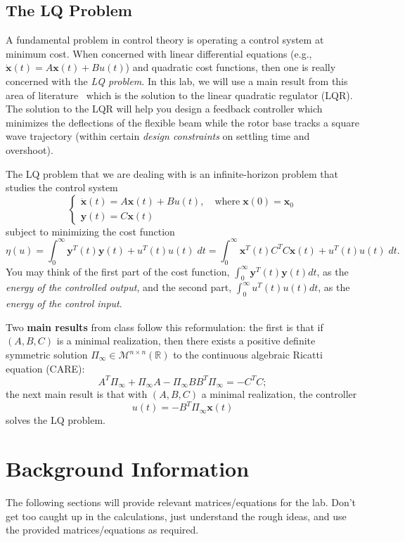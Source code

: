 \subsection{The LQ Problem}
A fundamental problem in control theory is operating a control system at minimum cost. When concerned with linear differential equations (e.g., $\mathbf{\dot{x}}(t) = A\mathbf{x}(t) + Bu(t)$) and quadratic cost functions, then one is really concerned with the \emph{LQ problem}. In this lab, we will use a main result from this area of literature~\cite{kwakernaak1972linear} which is the solution to the linear quadratic regulator (LQR). The solution to the LQR will help you design a feedback controller which minimizes the deflections of the flexible beam while the rotor base tracks a square wave trajectory (within certain \emph{design constraints} on settling time and overshoot).

The LQ problem that we are dealing with is an infinite-horizon problem that studies the control system
\[
    \begin{cases}
        \dot{\mathbf{x}}(t) = A\mathbf{x}(t)+Bu(t), \quad \text{where} \; \mathbf{x}(0) = \mathbf{x}_0 \\
        \mathbf{y}(t) = C \mathbf{x}(t)
    \end{cases}
\]
subject to minimizing the cost function
\[
    \eta(u) = \int_0^{\infty} \mathbf{y}^T(t)\mathbf{y}(t) + u^T(t)u(t) \; dt = \int_0^\infty  \mathbf{x}^T(t) C^T C \mathbf{x}(t) + u^T(t)u(t) \; dt.
\]
You may think of the first part of the cost function, $ \int_0^{\infty} \mathbf{y}^T(t)\mathbf{y}(t) dt$, as the \emph{energy of the controlled output}, and the second part, $\int_0^{\infty} u^T(t)u(t) dt$, as the \emph{energy of the control input}.

Two \textbf{main results} from class follow this reformulation: the first is that if $(A,B,C)$ is a minimal realization, then there exists a positive definite symmetric solution $\Pi_{\infty} \in \mathcal{M}^{n \times n}(\mathbb{R})$ to the continuous algebraic Ricatti equation (CARE):
\[
    A^T \Pi_{\infty} + \Pi_{\infty} A - \Pi_{\infty} B B^T \Pi_{\infty} = -C^T C;
\]
the next main result is that with $(A,B,C)$ a minimal realization, the controller
\[
    u(t) = -B^T \Pi_{\infty} \mathbf{x}(t)
\]
solves the LQ problem.

\section{Background Information}\label{section:lab4_prelab}
The following sections will provide relevant matrices/equations for the lab. Don't get too caught up in the calculations, just understand the rough ideas, and use the provided matrices/equations as required.


